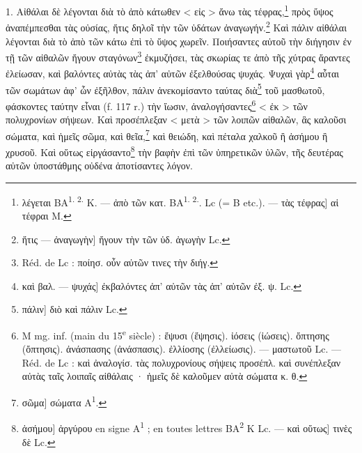 \documentclass[landscape, a4paper, 11pt, oneside, polutonikogreek, french]{article}
\begin{document}
\bigskip

1. Αἰθάλαι δὲ λέγονται διὰ τὸ ἀπὸ κάτωθεν < εἰς > ἄνω τὰς τέφρας,\footnote{λέγεται BA\textsuperscript{1. 2.} K. --- ἀπὸ τῶν κατ. BA\textsuperscript{1. 2.}. Lc (= B etc.). --- τὰς τέφρας] αἱ τέφραι M.} πρὸς ὕψος ἀναπέμπεσθαι τὰς οὐσίας, ἥτις δηλοῖ τὴν τῶν ὑδάτων ἀναγωγήν.\footnote{ἥτις --- ἀναγωγὴν] ἤγουν τὴν τῶν ὑδ. ἀγωγὴν Lc.} Καὶ πάλιν αἰθάλαι λέγονται διὰ τὸ ἀπὸ τῶν κάτω ἐπὶ τὸ ὕψος χωρεῖν. Ποιήσαντες αὐτοῦ τὴν διήγησιν ἐν τῇ τῶν αἰθαλῶν ἤγουν σταγόνων\footnote{Réd. de Lc : ποίησ. οὖν αὐτῶν τινες τὴν διήγ.} ἐκμυζήσει, τὰς σκωρίας τε ἀπὸ τῆς χύτρας ἄραντες ἐλείωσαν, καὶ βαλόντες αὐτὰς τὰς ἀπ' αὐτῶν ἐξελθούσας ψυχάς. Ψυχαὶ γὰρ\footnote{καὶ βαλ. --- ψυχάς] ἐκβαλόντες ἀπ' αὐτῶν τὰς ἀπ' αὐτῶν ἐξ. ψ. Lc.} αὗται τῶν σωμάτων ἀφ' ὧν ἐξῆλθον, πάλιν ἀνεκομίσαντο ταύτας διὰ\footnote{πάλιν] διὸ καὶ πάλιν Lc.} τοῦ μασθωτοῦ, φάσκοντες ταύτην εἶναι (f. 117 r.) τὴν ἴωσιν, ἀναλογήσαντες\footnote{M mg. inf. (main du 15\textsuperscript{e} siècle) : ἔψυσι (ἔψησις). ἰόσεις (ἰώσεις). ὄπτησης (ὄπτησις). ἀνάσπασης (ἀνάσπασις). ἐλλίοσης (ἐλλείωσις). --- μαστωτοῦ Lc. --- Réd. de Lc : καὶ ἀναλογίσ. τὰς πολυχρονίους σήψεις προσέπλ. καὶ συνέπλεξαν αὐτὰς ταῖς λοιπαῖς αἰθάλαις · ἡμεῖς δὲ καλοῦμεν αὐτὰ σώματα κ. θ.} < ἐκ > τῶν πολυχρονίων σήψεων. Καὶ προσέπλεξαν < μετὰ > τῶν λοιπῶν αἰθαλῶν, ἃς καλοῦσι σώματα, καὶ ἡμεῖς σῶμα, καὶ θεῖα,\footnote{σῶμα] σώματα A\textsuperscript{1}.} καὶ θειώδη, καὶ πέταλα χαλκοῦ ἢ ἀσήμου ἢ χρυσοῦ. Καὶ οὕτως εἰργάσαντο\footnote{ἀσήμου] ἀργύρου en signe A\textsuperscript{1} ; en toutes lettres BA\textsuperscript{2} K Lc. --- καὶ οὕτως] τινὲς δὲ Lc.} τὴν βαφὴν ἐπὶ τῶν ὑπηρετικῶν ὑλῶν, τῆς δευτέρας αὐτῶν ὑποστάθμης οὐδένα ἀποτίσαντες λόγον.
\end{document}
